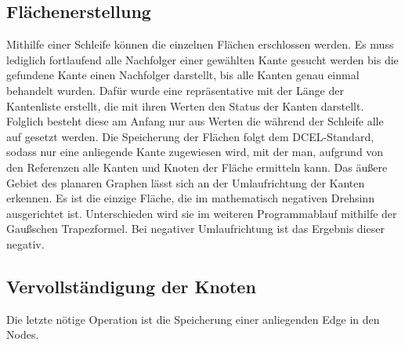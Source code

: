 \subsection{Flächenerstellung}
Mithilfe einer Schleife können die einzelnen Flächen erschlossen werden.
Es muss lediglich fortlaufend alle Nachfolger einer gewählten Kante gesucht werden bis die gefundene Kante einen Nachfolger darstellt, bis alle Kanten genau einmal behandelt wurden.
Dafür wurde eine repräsentative  mit der Länge der Kantenliste erstellt, die mit ihren Werten den Status der Kanten darstellt.
Folglich besteht diese am Anfang nur aus  Werten die während der Schleife alle auf  gesetzt werden.
Die Speicherung der Flächen folgt dem DCEL-Standard, sodass nur eine anliegende Kante zugewiesen wird, mit der man, aufgrund von den Referenzen alle Kanten und Knoten der Fläche ermitteln kann.
Das äußere Gebiet des planaren Graphen lässt sich an der Umlaufrichtung der Kanten erkennen.
Es ist die einzige Fläche, die im mathematisch negativen Drehsinn ausgerichtet ist.
Unterschieden wird sie im weiteren Programmablauf mithilfe der Gaußschen Trapezformel.
Bei negativer Umlaufrichtung ist das Ergebnis dieser negativ.

\subsection{Vervollständigung der Knoten}
Die letzte nötige Operation ist die Speicherung einer anliegenden Edge in den Nodes.